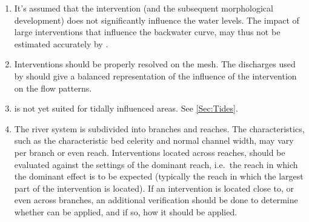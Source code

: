 \begin{enumerate}
\item It's assumed that the intervention (and the subsequent morphological development) does not significantly influence the water levels.
The impact of large interventions that influence the backwater curve, may thus not be estimated accurately by \dfmi.

\item Interventions should be properly resolved on the \dflowfm mesh.
The discharges used by \dfmi should give a balanced representation of the influence of the intervention on the flow patterns.

\item \dfastmi is not yet suited for tidally influenced areas.
See \autoref{Sec:Tides}.

\item \label{reach_bnd} The river system is subdivided into branches and reaches.
The characteristics, such as the characteristic bed celerity and normal channel width, may vary per branch or even reach.
Interventions located across reaches, should be evaluated against the settings of the dominant reach, i.e.~the reach in which the dominant effect is to be expected (typically the reach in which the largest part of the intervention is located).
If an intervention is located close to, or even across branches, an additional verification should be done to determine whether \dfmi can be applied, and if so, how it should be applied.


\end{enumerate}
